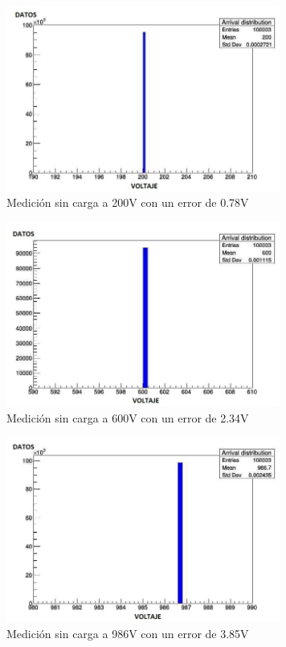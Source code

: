 \begin{figure}[H]
\centering
\includegraphics[width=9cm]{Capitulo3/figs/200V.jpg}
\caption{Medición sin carga a 200V con un error de 0.78V}
\end{figure}

\begin{figure}[H]
\centering
\includegraphics[width=9cm]{Capitulo3/figs/600v.jpg}
\caption{Medición sin carga a 600V con un error de 2.34V}
\end{figure}

\begin{figure}[H]
\centering
\includegraphics[width=9cm]{Capitulo3/figs/986V.jpg}
\caption{Medición sin carga a 986V con un error de 3.85V}
\end{figure}

